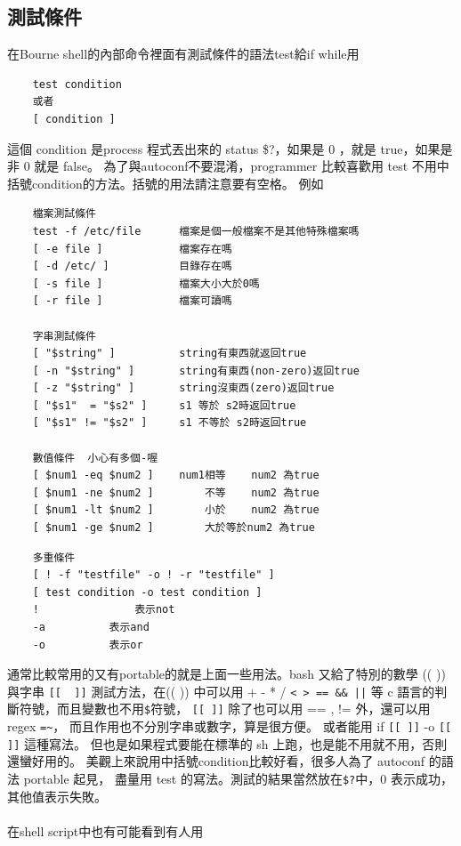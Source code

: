     \subsection{測試條件}
    在Bourne shell的內部命令裡面有測試條件的語法test給if while用
    \begin{verbatim}
    test condition
    或者 
    [ condition ]
    \end{verbatim}
    這個 condition 是process 程式丟出來的 status \$?，如果是 0 ，就是
    true，如果是非 0 就是 false。 為了與autoconf不要混淆，programmer
    比較喜歡用 test 不用中括號condition的方法。括號的用法請注意要有空格。
    例如
    \begin{verbatim}
    檔案測試條件
    test -f /etc/file      檔案是個一般檔案不是其他特殊檔案嗎
    [ -e file ]            檔案存在嗎
    [ -d /etc/ ]           目錄存在嗎
    [ -s file ]            檔案大小大於0嗎
    [ -r file ]            檔案可讀嗎

    字串測試條件
    [ "$string" ]          string有東西就返回true
    [ -n "$string" ]       string有東西(non-zero)返回true
    [ -z "$string" ]       string沒東西(zero)返回true
    [ "$s1"  = "$s2" ]     s1 等於 s2時返回true
    [ "$s1" != "$s2" ]     s1 不等於 s2時返回true

    數值條件  小心有多個-喔
    [ $num1 -eq $num2 ]    num1相等    num2 為true   
    [ $num1 -ne $num2 ]        不等    num2 為true
    [ $num1 -lt $num2 ]        小於    num2 為true
    [ $num1 -ge $num2 ]        大於等於num2 為true
    \end{verbatim}
    \begin{verbatim}
    多重條件
    [ ! -f "testfile" -o ! -r "testfile" ]
    [ test condition -o test condition ]
    !               表示not
    -a		    表示and
    -o		    表示or
    \end{verbatim}
    通常比較常用的又有portable的就是上面一些用法。bash 又給了特別的數學
    ((  )) 與字串 \verb=[[  ]]= 測試方法，在(( )) 中可以用 + - * /
    \verb/< > == && ||/ 等 c 語言的判斷符號，而且變數也不用\verb=$=符號，
    \verb=[[ ]]= 除了也可以用 == , != 外，還可以用 regex \verb/=~/，
    而且作用也不分別字串或數字，算是很方便。
    或者能用 if \verb=[[ ]]= -o \verb=[[ ]]= 這種寫法。
    但也是如果程式要能在標準的 sh 上跑，也是能不用就不用，否則還蠻好用的。
    美觀上來說用中括號condition比較好看，很多人為了 autoconf 的語法 portable 
    起見， 盡量用 test 的寫法。測試的結果當然放在\verb=$?=中，0 表示成功，
    其他值表示失敗。
    \\\\
    在shell script中也有可能看到有人用
